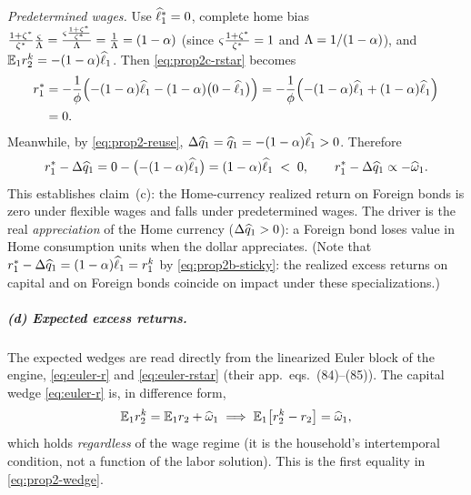 \emph{Predetermined wages.} Use $\widehat{\ell}^{*}_1=0$, complete home bias
$\frac{1+\zeta^{*}}{\zeta^{*}}\frac{\varsigma}{\Lambda}=\frac{\varsigma\frac{1+\zeta^{*}}{\zeta^{*}}}{\Lambda}
=\frac{1}{\Lambda}=(1-\alpha)$ (since $\varsigma\frac{1+\zeta^{*}}{\zeta^{*}}=1$ and
$\Lambda=1/(1-\alpha)$), and $\mathbb{E}_1r^{k}_2=-(1-\alpha)\widehat{\ell}_1$. Then
\eqref{eq:prop2c-rstar} becomes
\begin{align}
r^{*}_1 &= -\frac{1}{\phi}\Bigl(-(1-\alpha)\widehat{\ell}_1-(1-\alpha)\bigl(0-\widehat{\ell}_1\bigr)\Bigr)
= -\frac{1}{\phi}\Bigl(-(1-\alpha)\widehat{\ell}_1+(1-\alpha)\widehat{\ell}_1\Bigr) \notag\\
&= 0. \label{eq:prop2c-rstar-val}
\end{align}
 Meanwhile, by \eqref{eq:prop2-reuse},
$\Delta\widehat{q}_1=\widehat{q}_1=-(1-\alpha)\widehat{\ell}_1>0$. Therefore
\begin{equation}
r^{*}_1-\Delta\widehat{q}_1 = 0-\bigl(-(1-\alpha)\widehat{\ell}_1\bigr)
= (1-\alpha)\widehat{\ell}_1 \;<\;0,
\qquad r^{*}_1-\Delta\widehat{q}_1\propto-\widehat{\omega}_1. \label{eq:prop2c-sticky}
\end{equation}
This establishes claim~(c): the Home-currency realized return on Foreign bonds is
zero under flexible wages and falls under predetermined wages. The driver is the
real \emph{appreciation} of the Home currency ($\Delta\widehat{q}_1>0$): a Foreign
bond loses value in Home consumption units when the dollar appreciates. (Note
that $r^{*}_1-\Delta\widehat{q}_1=(1-\alpha)\widehat{\ell}_1=r^{k}_1$ by
\eqref{eq:prop2b-sticky}: the realized excess returns on capital and on Foreign
bonds coincide on impact under these specializations.)

\subparagraph{(d) Expected excess returns.} The expected wedges are read directly
from the linearized Euler block of the engine, \eqref{eq:euler-r} and
\eqref{eq:euler-rstar} (their app.~eqs.~(84)--(85)). The capital wedge
\eqref{eq:euler-r} is, in difference form,
\begin{equation}
\mathbb{E}_1r^{k}_2 = \mathbb{E}_1r_2 + \widehat{\omega}_1
\;\Longrightarrow\;
\mathbb{E}_1\bigl[r^{k}_2-r_2\bigr] = \widehat{\omega}_1, \label{eq:prop2d-cap}
\end{equation}
which holds \emph{regardless} of the wage regime (it is the household's
intertemporal condition, not a function of the labor solution). This is the first
equality in \eqref{eq:prop2-wedge}.

